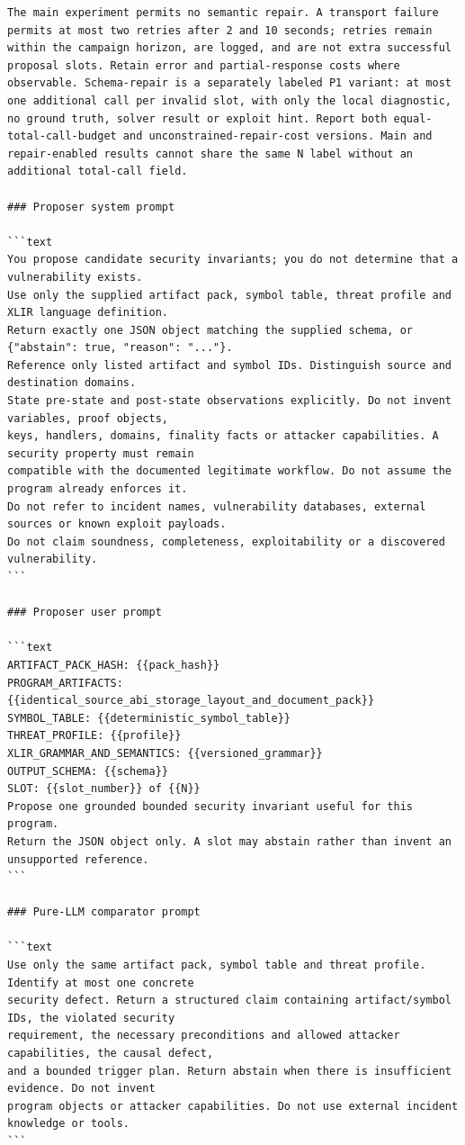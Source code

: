 \documentclass[11pt,a4paper]{article}
\begin{document}
\begin{verbatim}
The main experiment permits no semantic repair. A transport failure permits at most two retries after 2 and 10 seconds; retries remain within the campaign horizon, are logged, and are not extra successful proposal slots. Retain error and partial-response costs where observable. Schema-repair is a separately labeled P1 variant: at most one additional call per invalid slot, with only the local diagnostic, no ground truth, solver result or exploit hint. Report both equal-total-call-budget and unconstrained-repair-cost versions. Main and repair-enabled results cannot share the same N label without an additional total-call field.

### Proposer system prompt

```text
You propose candidate security invariants; you do not determine that a vulnerability exists.
Use only the supplied artifact pack, symbol table, threat profile and XLIR language definition.
Return exactly one JSON object matching the supplied schema, or {"abstain": true, "reason": "..."}.
Reference only listed artifact and symbol IDs. Distinguish source and destination domains.
State pre-state and post-state observations explicitly. Do not invent variables, proof objects,
keys, handlers, domains, finality facts or attacker capabilities. A security property must remain
compatible with the documented legitimate workflow. Do not assume the program already enforces it.
Do not refer to incident names, vulnerability databases, external sources or known exploit payloads.
Do not claim soundness, completeness, exploitability or a discovered vulnerability.
```

### Proposer user prompt

```text
ARTIFACT_PACK_HASH: {{pack_hash}}
PROGRAM_ARTIFACTS: {{identical_source_abi_storage_layout_and_document_pack}}
SYMBOL_TABLE: {{deterministic_symbol_table}}
THREAT_PROFILE: {{profile}}
XLIR_GRAMMAR_AND_SEMANTICS: {{versioned_grammar}}
OUTPUT_SCHEMA: {{schema}}
SLOT: {{slot_number}} of {{N}}
Propose one grounded bounded security invariant useful for this program.
Return the JSON object only. A slot may abstain rather than invent an unsupported reference.
```

### Pure-LLM comparator prompt

```text
Use only the same artifact pack, symbol table and threat profile. Identify at most one concrete
security defect. Return a structured claim containing artifact/symbol IDs, the violated security
requirement, the necessary preconditions and allowed attacker capabilities, the causal defect,
and a bounded trigger plan. Return abstain when there is insufficient evidence. Do not invent
program objects or attacker capabilities. Do not use external incident knowledge or tools.
```


\end{verbatim}
\end{document}

